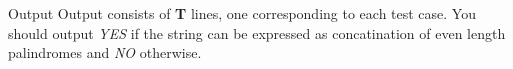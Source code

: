 Output
Output consists of   \textbf{    T   }   lines, one corresponding to each test case. You should output   \emph{    YES   }   if the string can be expressed as concatination of even length palindromes and   \emph{    NO   }   otherwise.